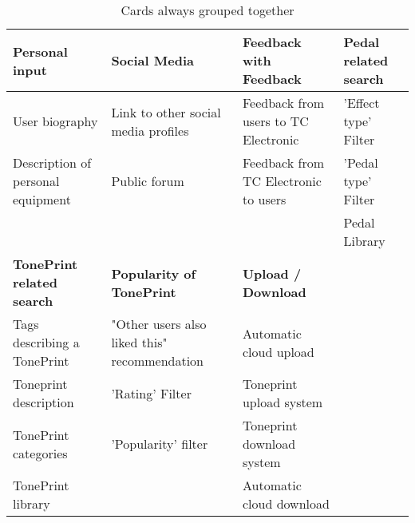 \begin{table}[h]
\begin{tabularx}{\textwidth}{|R|R|R|R|}
\hline
{} \textbf{Personal input} & \textbf{Social Media} & \textbf{Feedback with Feedback} & \textbf{Pedal related search}\\ \hline
User biography & Link to other social media profiles & Feedback from users to TC Electronic & 'Effect type' Filter \\
Description of personal equipment & Public forum & Feedback from TC Electronic to users & 'Pedal type' Filter \\ 
&&& Pedal Library \\ \hline
{} \textbf{TonePrint related search} & \textbf{Popularity of TonePrint} & \textbf{Upload / Download} & \\ \hline
Tags describing a TonePrint & "Other users also liked this" recommendation & Automatic cloud upload & \\
Toneprint description & 'Rating' Filter & Toneprint upload system & \\ 
TonePrint categories & 'Popularity' filter & Toneprint download system & \\
TonePrint library & & Automatic cloud download & \\ \hline
\end{tabularx}
\caption{Cards always grouped together}
\label{FrequentGroups}
\end{table}






